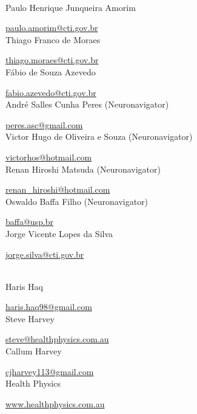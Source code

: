 \scalebox{2.0}{\sffamily Authors}
\\

Paulo Henrique Junqueira Amorim

\href{mailto:paulo.amorim@cti.gov.br}{paulo.amorim@cti.gov.br}
\\


Thiago Franco de Moraes

\href{mailto:thiago.moraes@cti.gov.br}{thiago.moraes@cti.gov.br}
\\


Fábio de Souza Azevedo

\href{mailto:fabio.azevedo@cti.gov.br}{fabio.azevedo@cti.gov.br}
\\


André Salles Cunha Peres (Neuronavigator)

\href{mailto:peres.asc@gmail.com}{peres.asc@gmail.com}
\\


Victor Hugo de Oliveira e Souza (Neuronavigator)

\href{mailto:victorhos@hotmail.com}{victorhos@hotmail.com}
\\


Renan Hiroshi Matsuda (Neuronavigator)

\href{mailto:renan\_hiroshi@hotmail.com}{renan\_hiroshi@hotmail.com}
\\


Oswaldo Baffa Filho (Neuronavigator)

\href{mailto:baffa@usp.br}{baffa@usp.br}
\\


Jorge Vicente Lopes da Silva

\href{mailto:jorge.silva@cti.gov.br}{jorge.silva@cti.gov.br}
\\

\newpage

\scalebox{2.0}{\sffamily User Guide Contributors}
\\

Haris Haq

\href{mailto:haris.haq98@gmail.com}{haris.haq98@gmail.com}
\\

Steve Harvey

\href{mailto:steve@healthphysics.com.au}{steve@healthphysics.com.au}
\\

Callum Harvey

\href{mailto:cjharvey113@gmail.com}{cjharvey113@gmail.com}
\\

Health Physics

\href{http://www.healthphysics.com.au}{www.healthphysics.com.au}
\\